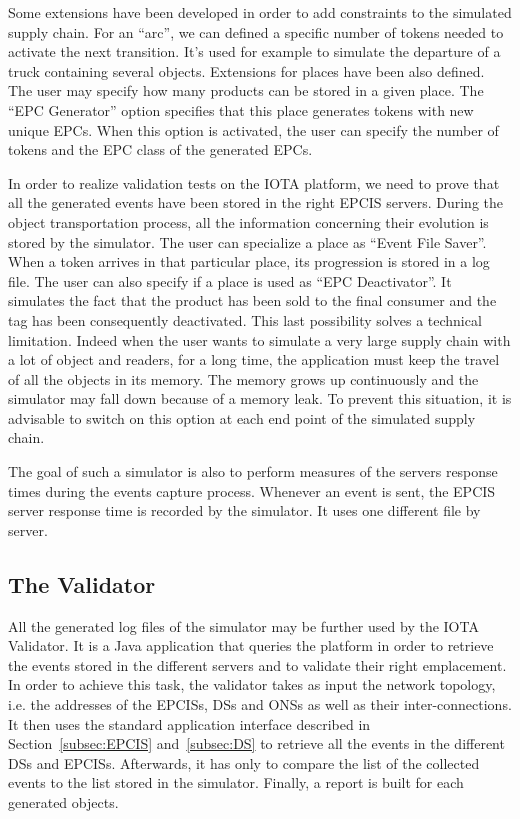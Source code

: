 \documentclass[a4paper]{llncs}
\begin{document}
Some extensions have been developed in order to add constraints to the
simulated supply chain. For an ``arc'', we can defined a specific number of
tokens needed to activate the next transition. It's used for example to
simulate the departure of a truck containing several objects.  Extensions for
places have been also defined. The user may specify how many products can be
stored in a given place. The ``EPC Generator'' option specifies that this place
generates tokens with new unique EPCs. When this option is
activated, the user can specify the number of tokens and the EPC class of the
generated EPCs.

In order to realize  validation tests on the IOTA platform, we need to prove
that all the generated events have been stored in the right EPCIS servers. During
the object transportation process, all the information concerning their
evolution is stored by the simulator.  The user can specialize a place as
``Event File Saver''.  When a token arrives in that particular place, its
progression is stored in a log file.  The user can also specify if a place is
used as ``EPC Deactivator''.  It simulates the fact that the product has been
sold to the final consumer and the tag has been consequently deactivated. This
last possibility solves a technical limitation. Indeed when the user wants to
simulate a very large supply chain with a lot of object and readers, for a long
time, the application must keep the travel of all the objects in its
memory. The memory grows up continuously and the simulator may fall down
because of a memory leak. To prevent this situation, it is advisable to switch on
this option at each end point of the simulated supply chain.

The goal of such a simulator is also to perform measures of the servers
response times during the events capture process.  Whenever an event is sent,
the EPCIS server response time is recorded by the simulator. It uses one
different file by server.  

\subsection{The Validator}
\label{subsec:validator}

All the generated log files of the simulator may be further used by the
IOTA Validator. It is a Java application that queries the platform in order to
retrieve the events stored in the different servers and to validate their right
emplacement.  In order to achieve this task, the validator takes as input the
network topology, i.e. the addresses of the EPCISs, DSs and ONSs as well as
their inter-connections. It then uses the standard application interface
described in Section~\ref{subsec:EPCIS} and~\ref{subsec:DS} to retrieve all the
events in the different DSs and EPCISs.  
Afterwards, it has only to compare the list of the collected events
to the list stored in the simulator. Finally, a report is built for each generated
objects.
\end{document}
